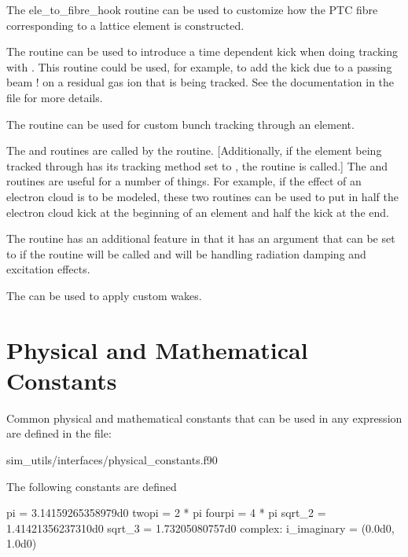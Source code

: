 {{{{{{The {ele_to_fibre_hook} routine can be used to customize how the PTC fibre corresponding to a
\bmad lattice element is constructed. 

The  routine can be used to introduce a time
dependent kick when doing tracking with . This routine could be used,
for example, to add the kick due to a passing beam ! on a residual gas ion that is being
tracked. See the documentation in the file 
for more details.

The  routine can be used for custom bunch tracking through an element.

The  and  routines are called by the
 routine. [Additionally, if the element being tracked through has its
tracking method set to , the  routine is called.] The
 and  routines are useful for a number of things. For
example, if the effect of an electron cloud is to be modeled, these two routines can be used to put
in half the electron cloud kick at the beginning of an element and half the kick at the end.

The routine  has an additional feature in that
it has an argument  that can be set to 
if the routine  will be called and  will
be handling radiation damping and excitation effects.

The  can be used to apply custom wakes.

\section{Physical and Mathematical Constants}
\label{s:physical.constants}

Common physical and mathematical constants that can be used in any expression
are defined in the file:
\begin{example}
 sim_utils/interfaces/physical_constants.f90
\end{example}

The following constants are defined
\begin{example}
  pi = 3.14159265358979d0
  twopi = 2 * pi
  fourpi = 4 * pi
  sqrt_2 = 1.41421356237310d0
  sqrt_3 = 1.73205080757d0
  complex: i_imaginary = (0.0d0, 1.0d0)


\end{example}}}}}}}
